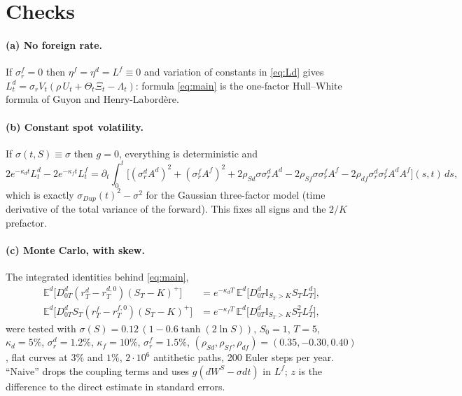 \documentclass[11pt,a4paper]{article}
\theoremstyle{plain}
\theoremstyle{remark}
\newcommand{\E}{\mathbb{E}}
\newcommand{\I}{\mathbb{I}}
\newcommand{\sgd}{\sigma^d_r}
\newcommand{\sgf}{\sigma^f_r}
\newcommand{\Ld}{L^{d}}
\newcommand{\Lf}{L^{f}}
\begin{document}
\section{Checks}\label{sec:checks}

\paragraph{(a) No foreign rate.} If $\sgf=0$ then $\eta^f=\eta^d=\Lf\equiv0$ and
variation of constants in \eqref{eq:Ld} gives
$\Ld_t=\sigma_rV_t(\rho\,U_t+\Theta_t\Xi_t-\Lambda_t)$: formula \eqref{eq:main}
is the one-factor Hull--White formula of Guyon and Henry-Labord\`ere.

\paragraph{(b) Constant spot volatility.} If $\sigma(t,S)\equiv\sigma$ then
$g=0$, everything is deterministic and
\[
2e^{-\kappa_dt}\Ld_t-2e^{-\kappa_ft}\Lf_t=\partial_t\!\int_0^t\!\Big[
(\sgd A^d)^2+(\sgf A^f)^2+2\rho_{Sd}\sigma\sgd A^d-2\rho_{Sf}\sigma\sgf A^f
-2\rho_{df}\sgd\sgf A^dA^f\Big](s,t)\,ds ,
\]
which is exactly $\sigma_{Dup}(t)^2-\sigma^2$ for the Gaussian three-factor
model (time derivative of the total variance of the forward). This fixes all
signs and the $2/K$ prefactor.

\paragraph{(c) Monte Carlo, with skew.} The integrated identities behind
\eqref{eq:main},
\begin{align*}
\E^d\big[D^d_{0T}(r^d_T-r^{d,0}_T)(S_T-K)^+\big]&=e^{-\kappa_dT}\,\E^d\big[D^d_{0T}\I_{S_T>K}S_T\Ld_T\big],\\
\E^d\big[D^d_{0T}S_T(r^f_T-r^{f,0}_T)(S_T-K)^+\big]&=e^{-\kappa_fT}\,\E^d\big[D^d_{0T}\I_{S_T>K}S_T^2\Lf_T\big],
\end{align*}
were tested with $\sigma(S)=0.12\,(1-0.6\tanh(2\ln S))$, $S_0=1$, $T=5$,
$\kappa_d=5\%$, $\sgd=1.2\%$, $\kappa_f=10\%$, $\sgf=1.5\%$,
$(\rho_{Sd},\rho_{Sf},\rho_{df})=(0.35,-0.30,0.40)$, flat curves at $3\%$ and
$1\%$, $2\cdot10^6$ antithetic paths, 200 Euler steps per year. ``Naive'' drops
the coupling terms and uses $g(dW^S-\sigma dt)$ in $\Lf$; $z$ is the
difference to the direct estimate in standard errors.
\end{document}
